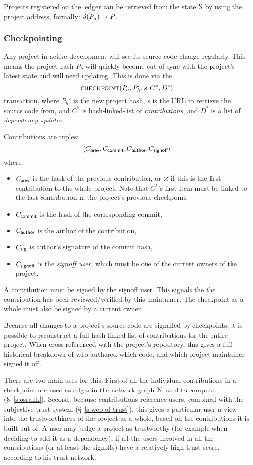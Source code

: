 Projects registered on the ledger can be retrieved from the state $\mathcal{S}$ by
using the project address, formally: $\mathcal{S}(P_a) \to P$.

\subsubsection{Checkpointing} Any project in active development will see its
source code change regularly. This means the project hash $P_h$ will quickly
become out of sync with the project's latest state and will need updating. This
is done via the
\[
    \text{\normalfont\scshape checkpoint}\small{\lparen P_a, P_h', s, C^*, D^*\rparen}
\]
transaction, where $P_h'$ is the new project hash, $s$ is the URL to
retrieve the source code from, and $C^*$ is hash-linked-list of
\emph{contributions}, and $D^*$ is a list of \emph{dependency updates}.

Contributions are tuples:
\[
   \langle C_{\mathsf{prev}}, C_{\mathsf{commit}}, C_{\mathsf{author}}, C_{\mathsf{signoff}}\rangle
\]
where:
\begin{itemize}
\item $C_{\mathsf{prev}}$ is the hash of the previous contribution, or
  $\varnothing$ if this is the first contribution to the whole
  project. Note that $C^*$'s first item must be linked to the last
  contribution in the project's previous checkpoint.
\item $C_{\mathsf{commit}}$ is the hash of the corresponding commit,
\item $C_{\mathsf{author}}$ is the author of the contribution,
\item $C_{\mathsf{sig}}$ is author's signature of the commit hash,
\item $C_{\mathsf{signoff}}$ is the \emph{signoff user}, which must be
  one of the current owners of the project.
\end{itemize}
A contribution must be signed by the signoff user. This signals the
the contribution has been reviewed/verified by this maintainer. The
checkpoint as a whole must also be signed by a current owner.

Because all changes to a project's source code are signalled by
checkpoints, it is possible to reconstruct a full hash-linked list of
contributions for the entire project. When cross-referenced with the
project's repository, this gives a full historical breakdown of who
authored which code, and which project maintainer signed it off.

There are two main uses for this. First of all the individual
contributions in a checkpoint are used as edges in the network graph
$\mathcal{N}$ used to compute \osrank{} (\S~\ref{s:osrank}).
Second, because contributions reference users, combined with the
subjective trust system (\S~\ref{s:web-of-trust}), this gives a
particular user a view into the trustworthiness of the project as a
whole, based on the contributions it is built out of. A user may judge
a project as trustworthy (for example when deciding to add it as a
dependency), if all the users involved in all the contributions (or at
least the signoffs) have a relatively high trust score, according to
his trust-network.

